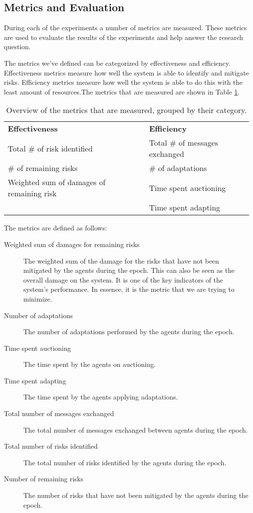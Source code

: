 \subsection{Metrics and Evaluation}
\label{ssec:metrics}
During each of the experiments a number of metrics are measured. These metrics are used to evaluate the results of the experiments and help answer the research question. 

The metrics we've defined can be categorized by effectiveness and efficiency. Effectiveness metrics measure how well the system is able to identify and mitigate risks. Efficiency metrics measure how well the system is able to do this with the least amount of resources.The metrics that are measured are shown in Table \ref{table:metrics-groups}.

\begin{table}[H]
    \centering
    \begin{tabular}{l|l}
        \textbf{Effectiveness}            & \textbf{Efficiency}            \\
        Total \# of risk identified       & Total \# of messages exchanged \\
        \# of remaining risks             & \# of adaptations              \\
        Weighted sum of damages of remaining risk & Time spent auctioning  \\
                                          & Time spent adapting            \\
    \end{tabular}
    \caption{\label{table:metrics-groups}Overview of the metrics that are measured, grouped by their category.}
\end{table}


The metrics are defined as follows:

\begin{description}
    \item[Weighted sum of damages for remaining risks] The weighted sum of the damage for the risks that have not been mitigated by the agents during the epoch. This can also be seen as the overall damage on the system. It is one of the key indicators of the system's performance. In essence, it is the metric that we are trying to minimize. 
    \item[Number of adaptations] The number of adaptations performed by the agents during the epoch.
    \item[Time spent auctioning] The time spent by the agents on auctioning.
    \item[Time spent adapting] The time spent by the agents applying adaptations.
    \item[Total number of messages exchanged] The total number of messages exchanged between agents during the epoch.
    \item[Total number of risks identified] The total number of risks identified by the agents during the epoch.
    \item[Number of remaining risks] The number of risks that have not been mitigated by the agents during the epoch.
\end{description}

